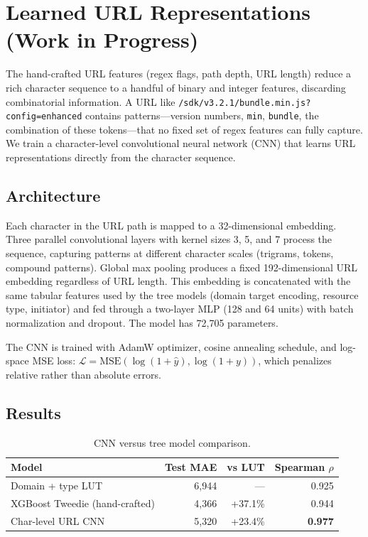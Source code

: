 \documentclass[11pt]{article}
\begin{document}
\section{Learned URL Representations (Work in Progress)}
\label{sec:url-cnn}

The hand-crafted URL features (regex flags, path depth, URL length) reduce a rich character sequence to a handful of binary and integer features, discarding combinatorial information. A URL like \texttt{/sdk/v3.2.1/bundle.min.js?config=enhanced} contains patterns---version numbers, \texttt{min}, \texttt{bundle}, the combination of these tokens---that no fixed set of regex features can fully capture. We train a character-level convolutional neural network (CNN) that learns URL representations directly from the character sequence.

\subsection{Architecture}

Each character in the URL path is mapped to a 32-dimensional embedding. Three parallel convolutional layers with kernel sizes 3, 5, and 7 process the sequence, capturing patterns at different character scales (trigrams, tokens, compound patterns). Global max pooling produces a fixed 192-dimensional URL embedding regardless of URL length. This embedding is concatenated with the same tabular features used by the tree models (domain target encoding, resource type, initiator) and fed through a two-layer MLP (128 and 64 units) with batch normalization and dropout. The model has 72,705 parameters.

The CNN is trained with AdamW optimizer, cosine annealing schedule, and log-space MSE loss: $\mathcal{L} = \text{MSE}(\log(1 + \hat{y}), \log(1 + y))$, which penalizes relative rather than absolute errors.

\subsection{Results}

\begin{table}[h]
\centering
\small
\begin{tabular}{lrrr}
\toprule
Model & Test MAE & vs LUT & Spearman $\rho$ \\
\midrule
Domain + type LUT & 6,944 & --- & 0.925 \\
XGBoost Tweedie (hand-crafted) & 4,366 & +37.1\% & 0.944 \\
Char-level URL CNN & 5,320 & +23.4\% & \textbf{0.977} \\
\bottomrule
\end{tabular}
\caption{CNN versus tree model comparison.}
\label{tab:cnn-results}
\end{table}
\end{document}

